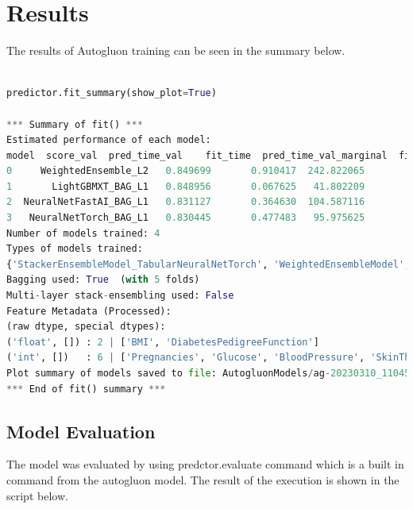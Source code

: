 \documentclass[
]{article}
\begin{document}
\hypertarget{results}{%
\section{Results}\label{results}}

The results of Autogluon training can be seen in the summary below.

\begin{lstlisting}[language=python]

predictor.fit_summary(show_plot=True)

*** Summary of fit() ***
Estimated performance of each model:
model  score_val  pred_time_val    fit_time  pred_time_val_marginal  fit_time_marginal  stack_level  can_infer  fit_order
0     WeightedEnsemble_L2   0.849699       0.910417  242.822065                0.000679           0.457114            2       True          4
1       LightGBMXT_BAG_L1   0.848956       0.067625   41.802209                0.067625          41.802209            1       True          1
2  NeuralNetFastAI_BAG_L1   0.831127       0.364630  104.587116                0.364630         104.587116            1       True          2
3   NeuralNetTorch_BAG_L1   0.830445       0.477483   95.975625                0.477483          95.975625            1       True          3
Number of models trained: 4
Types of models trained:
{'StackerEnsembleModel_TabularNeuralNetTorch', 'WeightedEnsembleModel', 'StackerEnsembleModel_NNFastAiTabular', 'StackerEnsembleModel_LGB'}
Bagging used: True  (with 5 folds)
Multi-layer stack-ensembling used: False 
Feature Metadata (Processed):
(raw dtype, special dtypes):
('float', []) : 2 | ['BMI', 'DiabetesPedigreeFunction']
('int', [])   : 6 | ['Pregnancies', 'Glucose', 'BloodPressure', 'SkinThickness', 'Insulin', ...]
Plot summary of models saved to file: AutogluonModels/ag-20230310_110459/SummaryOfModels.html
*** End of fit() summary ***

\end{lstlisting}

\hypertarget{model-evaluation}{%
\subsection{Model Evaluation}\label{model-evaluation}}

The model was evaluated by using predctor.evaluate command which is a
built in command from the autogluon model. The result of the execution
is shown in the script below.
\end{document}
